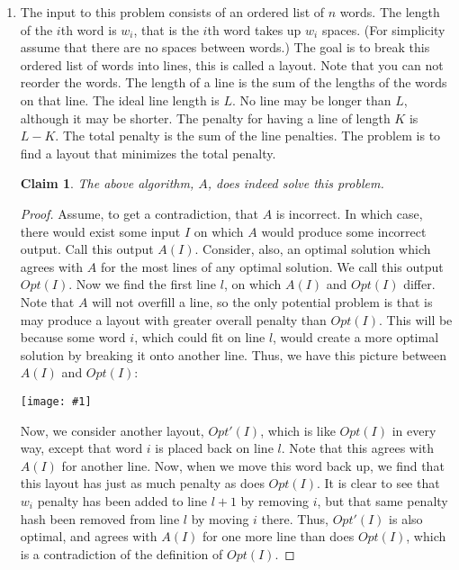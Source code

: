 \documentclass{article}
\newtheorem{thm}{Claim}
\providecommand{\image}[1]{
    \begin{center}
        \texttt{[image: \#1]}
    \end{center}
}
\begin{document}
    \begin{enumerate}[label=(\alph*)]
        \item The input to this problem consists of an ordered list of $n$ words. 
        The length of the $i$th word is $w_i$, that is the $i$th word takes up $w_i$ spaces. 
        (For simplicity assume that there are no spaces between words.)
        The goal is to break this ordered list of words into lines, this is called a layout. 
        Note that you can not reorder the words. 
        The length of a line is the sum of the lengths of the words on that line. 
        The ideal line length is $L$. 
        No line may be longer than $L$, although it may be shorter. 
        The penalty for having a line of length $K$ is $L − K$. 
        The total penalty is the sum of the line penalties.
        The problem is to find a layout that minimizes the total penalty.
        
        \begin{thm}
        	The above algorithm, $A$, does indeed solve this problem.
        \end{thm}
        \begin{proof}
        	Assume, to get a contradiction, that $A$ is incorrect.
        	In which case, there would exist some input $I$ on which $A$ would produce some incorrect output.
        	Call this output $A(I)$.
        	Consider, also, an optimal solution which agrees with $A$ for the most lines of any optimal solution.
        	We call this output $Opt(I)$.
        	Now we find the first line $l$, on which $A(I)$ and $Opt(I)$ differ.
        	Note that $A$ will not overfill a line, so the only potential problem is that is may produce a layout with greater overall penalty than $Opt(I)$.
        	This will be because some word $i$, which could fit on line $l$, would create a more optimal solution by breaking it onto another line.
        	Thus, we have this picture between $A(I)$ and $Opt(I)$:
        	
        	\image{p6a}
        	
        	Now, we consider another layout, $Opt'(I)$, which is like $Opt(I)$ in every way, except that word $i$ is placed back on line $l$. Note that this agrees with $A(I)$ for another line.
        	Now, when we move this word back up, we find that this layout has just as much penalty as does $Opt(I)$.
        	It is clear to see that $w_i$ penalty has been added to line $l+1$ by removing $i$, but that same penalty hash been removed from line $l$ by moving $i$ there.
        	Thus, $Opt'(I)$ is also optimal, and agrees with $A(I)$ for one more line than does $Opt(I)$, which is a contradiction of the definition of $Opt(I)$.
        	

\end{proof}
\end{enumerate}
\end{document}
